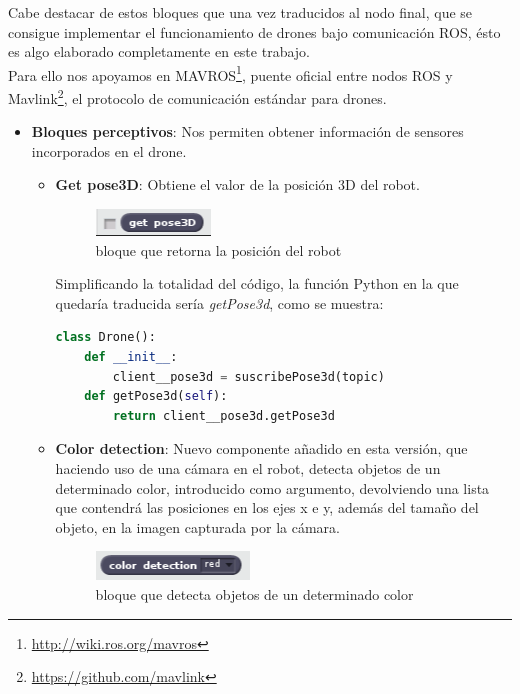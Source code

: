 Cabe destacar de estos bloques que una vez traducidos al nodo final, que se consigue implementar el funcionamiento de drones bajo comunicación ROS, ésto es algo elaborado completamente en este trabajo.\\

Para ello nos apoyamos en MAVROS\footnote{\url{http://wiki.ros.org/mavros}}, puente oficial entre nodos ROS y Mavlink\footnote{\url{https://github.com/mavlink}}, el protocolo de comunicación estándar para drones.

\begin{itemize}
\item \textbf{Bloques perceptivos}:
Nos permiten obtener información de sensores incorporados en el drone.
	\begin{itemize}
	\item \textbf{Get pose3D}: Obtiene el valor de la posición 3D del robot.
		\begin{figure}[H]
     		\centering
     		\includegraphics[scale=1.2]{img/block-pose.png}
     		\caption{bloque que retorna la posición del robot}
  		\label{fig:listas}
		\end{figure}
Simplificando la totalidad del código, la función Python en la que quedaría traducida sería \textit{getPose3d}, como se muestra:\\

\begin{lstlisting}[language=python,firstnumber=1]
class Drone():
    def __init__:
        client__pose3d = suscribePose3d(topic)
    def getPose3d(self):
        return client__pose3d.getPose3d
\end{lstlisting}
	\item \textbf{Color detection}: Nuevo componente añadido en esta versión, que haciendo uso de una cámara en el robot, detecta objetos de un determinado color, introducido como argumento, devolviendo una lista que contendrá las posiciones en los ejes x e y, además del tamaño del objeto, en la imagen capturada por la cámara.\\
	\begin{figure}[H]
     		\centering
     		\includegraphics[scale=1.2]{img/block-color.png}
     		\caption{bloque que detecta objetos de un determinado color}
  		\label{fig:listas}
  				\end{figure}
  				

\end{itemize}
\end{itemize}
